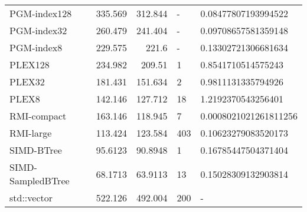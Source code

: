 \begin{tabular}{lrrll}
 PGM-index128      &               335.569  &              312.844  & -            & 0.08477807193994522   \\
 PGM-index32       &               260.479  &              241.404  & -            & 0.09708657581359148   \\
 PGM-index8        &               229.575  &              221.6    & -            & 0.13302721306681634   \\
 PLEX128           &               234.982  &              209.51   & 1            & 0.8541710514575243    \\
 PLEX32            &               181.431  &              151.634  & 2            & 0.9811131335794926    \\
 PLEX8             &               142.146  &              127.712  & 18           & 1.2192370543256401    \\
 RMI-compact       &               163.146  &              118.945  & 7            & 0.0008021021261811256 \\
 RMI-large         &               113.424  &              123.584  & 403          & 0.10623279083520173   \\
 SIMD-BTree        &                95.6123 &               90.8948 & 1            & 0.16785447504371404   \\
 SIMD-SampledBTree &                68.1713 &               63.9113 & 13           & 0.15028309132903814   \\
 std::vector       &               522.126  &              492.004  & 200          & -                     \\
\hline
\end{tabular}